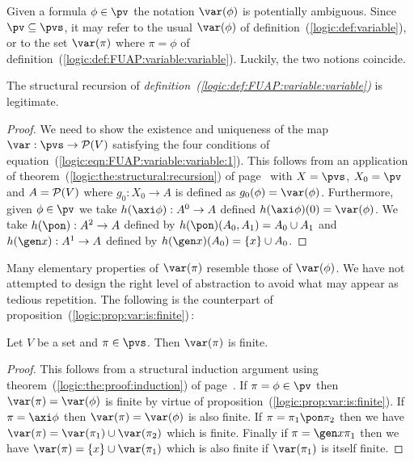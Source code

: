 Given a formula $\phi\in\pv$ the notation $\var(\phi)$ is
potentially ambiguous. Since $\pv\subseteq\pvs$, it may refer to the
usual $\var(\phi)$ of definition~(\ref{logic:def:variable}), or to
the set $\var(\pi)$ where $\pi=\phi$ of
definition~(\ref{logic:def:FUAP:variable:variable}). Luckily, the
two notions coincide.

\begin{prop}\label{logic:prop:FUAP:variable:recursion}
The structural recursion of {\em
definition~(\ref{logic:def:FUAP:variable:variable})} is legitimate.
\end{prop}
\begin{proof}
We need to show the existence and uniqueness of the map
$\var:\pvs\to{\cal P}(V)$ satisfying the four conditions of
equation~(\ref{logic:eqn:FUAP:variable:variable:1}). This follows
from an application of
theorem~(\ref{logic:the:structural:recursion}) of
page~\pageref{logic:the:structural:recursion} with $X=\pvs$,
$X_{0}=\pv$ and $A={\cal P}(V)$ where $g_{0}:X_{0}\to A$ is defined
as $g_{0}(\phi)=\var(\phi)$. Furthermore, given $\phi\in\pv$ we take
$h(\axi\phi):A^{0}\to A$ defined $h(\axi\phi)(0)=\var(\phi)$. We
take $h(\pon):A^{2}\to A$ defined by $h(\pon)(A_{0},A_{1})=A_{0}\cup
A_{1}$ and $h(\gen x):A^{1}\to A$ defined by $h(\gen
x)(A_{0})=\{x\}\cup A_{0}$.
\end{proof}

Many elementary properties of $\var(\pi)$ resemble those of
$\var(\phi)$. We have not attempted to design the right level of
abstraction to avoid what may appear as tedious repetition. The
following is the counterpart of
proposition~(\ref{logic:prop:var:is:finite})\,:

\begin{prop}\label{logic:prop:FUAP:variable:finite}
Let $V$ be a set and $\pi\in\pvs$. Then $\var(\pi)$ is finite.
\end{prop}
\begin{proof}
This follows from a structural induction argument using
theorem~(\ref{logic:the:proof:induction}) of
page~\pageref{logic:the:proof:induction}. If $\pi=\phi\in\pv$ then
$\var(\pi)=\var(\phi)$ is finite by virtue of
proposition~(\ref{logic:prop:var:is:finite}). If $\pi=\axi\phi$ then
$\var(\pi)=\var(\phi)$ is also finite. If $\pi=\pi_{1}\pon\pi_{2}$
then we have $\var(\pi)=\var(\pi_{1})\cup\var(\pi_{2})$ which is
finite. Finally  if $\pi=\gen x\pi_{1}$ then we have
$\var(\pi)=\{x\}\cup\var(\pi_{1})$ which is also finite if
$\var(\pi_{1})$ is itself finite.
\end{proof}

